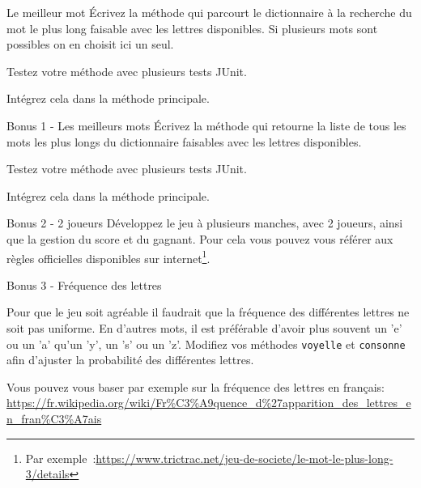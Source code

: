 \documentclass[a4paper,11pt]{style-esi/td}
\begin{document}
        \FloatBarrier
 	\begin{Exercice}{Le meilleur mot}
 	 	\'Ecrivez la méthode 
		qui parcourt le dictionnaire à la recherche du mot le plus long faisable 
		avec les lettres disponibles. 
		Si plusieurs mots sont possibles on en choisit ici un seul.

		Testez votre méthode avec plusieurs tests JUnit.

                Intégrez cela dans la méthode principale.
	\end{Exercice}

 	\begin{Exercice}{Bonus 1 - Les meilleurs mots}
 	 	\'Ecrivez la méthode 
		qui retourne la liste de tous les mots les plus longs du dictionnaire 
		faisables avec les lettres disponibles.

		Testez votre méthode avec plusieurs tests JUnit.

		Intégrez cela dans la méthode principale.
	\end{Exercice}


 	\begin{Exercice}{Bonus 2 - 2 joueurs}
		Développez le jeu à plusieurs manches, avec 2 joueurs, 
		ainsi que la gestion du score et du gagnant.
		Pour cela vous pouvez vous référer aux règles officielles  
		disponibles sur internet\footnote{Par exemple~:\url{https://www.trictrac.net/jeu-de-societe/le-mot-le-plus-long-3/details}}.
	\end{Exercice}
		
 	\begin{Exercice}{Bonus 3 - Fréquence des lettres}
		
		Pour que le jeu soit agréable il faudrait que la fréquence des
		différentes lettres ne soit pas uniforme. En d'autres mots, il est
		préférable d'avoir plus souvent un 'e' ou un 'a' qu'un 'y', un 's'
		ou un 'z'. Modifiez vos méthodes \texttt{voyelle} et \texttt{consonne}
		afin d'ajuster la probabilité des différentes lettres. 
		
		Vous pouvez vous baser par exemple sur la fréquence des lettres en français:
		 \url{https://fr.wikipedia.org/wiki/Fr%C3%A9quence_d%27apparition_des_lettres_en_fran%C3%A7ais}
	
	 \end{Exercice}
		
\end{document}

